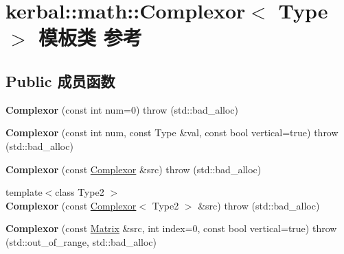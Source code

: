 \hypertarget{classkerbal_1_1math_1_1_complexor}{}\section{kerbal\+:\+:math\+:\+:Complexor$<$ Type $>$ 模板类 参考}
\label{classkerbal_1_1math_1_1_complexor}
\subsection*{Public 成员函数}
\begin{DoxyCompactItemize}
\item 
\mbox{\label{classkerbal_1_1math_1_1_complexor_a8bbfa5e774a09471c77b8dabdb7d9db6}} 
{\bfseries Complexor} (const int num=0)  throw (std\+::bad\+\_\+alloc)
\item 
\mbox{\label{classkerbal_1_1math_1_1_complexor_af70dc8924c27d74a0071a2b54d5dd9d9}} 
{\bfseries Complexor} (const int num, const Type \&val, const bool vertical=true)  throw (std\+::bad\+\_\+alloc)
\item 
\mbox{\label{classkerbal_1_1math_1_1_complexor_a9280555b5a9d23b422f7b944b00b3a89}} 
{\bfseries Complexor} (const \hyperlink{classkerbal_1_1math_1_1_complexor}{Complexor} \&src)  throw (std\+::bad\+\_\+alloc)
\item 
\mbox{\label{classkerbal_1_1math_1_1_complexor_a8c39bfcadbe7e8407842a8cada4c6618}} 
{\footnotesize template$<$class Type2 $>$ }\\{\bfseries Complexor} (const \hyperlink{classkerbal_1_1math_1_1_complexor}{Complexor}$<$ Type2 $>$ \&src)  throw (std\+::bad\+\_\+alloc)
\item 
\mbox{\label{classkerbal_1_1math_1_1_complexor_a17b838a214193cfb0fce42c10eb8f11a}} 
{\bfseries Complexor} (const \hyperlink{classkerbal_1_1math_1_1_matrix}{Matrix} \&src, int index=0, const bool vertical=true)  throw (std\+::out\+\_\+of\+\_\+range, std\+::bad\+\_\+alloc)
\item 
\mbox{\label{classkerbal_1_1math_1_1_complexor_a8df37cf6a3ef4ca41ac632d9d4e492db}} 

\end{DoxyCompactItemize}
